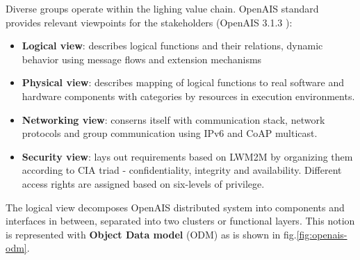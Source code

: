 \documentclass[11pt, english, a4paper, twoside]{article}
\begin{document}
Diverse groups operate within the lighing value chain. OpenAIS standard provides relevant viewpoints for the stakeholders (OpenAIS 3.1.3 \cite{openais}):
\begin{itemize}
	\itemsep0em
	\item  \textbf{Logical view}: describes logical functions and their relations, dynamic behavior using message flows and extension mechanisms
	\item \textbf{Physical view}: describes mapping of logical functions to real software and hardware components with categories by resources in execution environments. 
	\item \textbf{Networking view}: conserns itself with communication stack, network protocols and group communication using IPv6 and CoAP multicast.
	\item \textbf{Security view}: lays out requirements based on LWM2M by organizing them according to CIA triad - confidentiality, integrity and availability. Different access rights are assigned based on six-levels of privilege.
\end{itemize}

The logical view decomposes OpenAIS distributed system into components and interfaces in between, separated into two clusters or functional layers. This notion is represented with \textbf{Object Data model} (ODM) as is shown in fig.\ref{fig:openais-odm}. 
\end{document}

